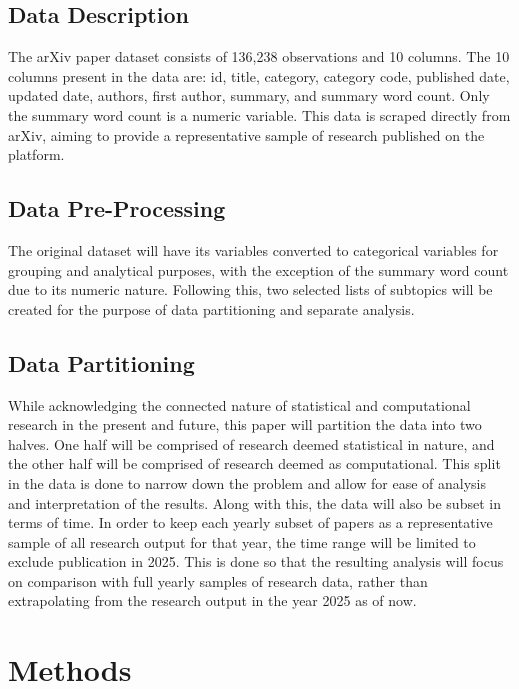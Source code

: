 \documentclass[
  12pt]{article}
\begin{document}
\subsection{Data Description}\label{data-description}

The arXiv paper dataset consists of 136,238 observations and 10 columns.
The 10 columns present in the data are: id, title, category, category
code, published date, updated date, authors, first author, summary, and
summary word count. Only the summary word count is a numeric variable.
This data is scraped directly from arXiv, aiming to provide a
representative sample of research published on the platform.

\subsection{Data Pre-Processing}\label{data-pre-processing}

The original dataset will have its variables converted to categorical
variables for grouping and analytical purposes, with the exception of
the summary word count due to its numeric nature. Following this, two
selected lists of subtopics will be created for the purpose of data
partitioning and separate analysis.

\subsection{Data Partitioning}\label{data-partitioning}

While acknowledging the connected nature of statistical and
computational research in the present and future, this paper will
partition the data into two halves. One half will be comprised of
research deemed statistical in nature, and the other half will be
comprised of research deemed as computational. This split in the data is
done to narrow down the problem and allow for ease of analysis and
interpretation of the results. Along with this, the data will also be
subset in terms of time. In order to keep each yearly subset of papers
as a representative sample of all research output for that year, the
time range will be limited to exclude publication in 2025. This is done
so that the resulting analysis will focus on comparison with full yearly
samples of research data, rather than extrapolating from the research
output in the year 2025 as of now.

\section{Methods}\label{sec-meth}
\end{document}
